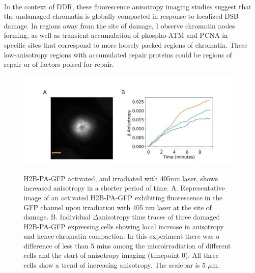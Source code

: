 \paragraph*{} In the context of DDR, these fluorescence anisotropy imaging studies suggest that the undamaged chromatin is globally compacted in response to localized DSB damage. In regions away from the site of damage, I observe chromatin nodes forming, as well as transient accumulation of phospho-ATM and PCNA in specific sites that correspond to more loosely packed regions of chromatin. These low-anisotropy regions with accumulated repair proteins could be regions of repair or of factors poised for repair. 

\begin{figure}[htp]
    {\hfill\includegraphics[clip, width=1\linewidth]{figures/pagfp.png}\hspace*{\fill}}
    \caption{H2B-PA-GFP activated, and irradiated with 405nm laser, shows increased anisotropy in a shorter period of time. A. Representative image of an activated H2B-PA-GFP exhibiting fluorescence in the GFP channel upon irradiation with 405 nm laser at the site of damage. B. Individual $\Delta$anisotropy time traces of three damaged H2B-PA-GFP expressing cells showing local increase in anisotropy and hence chromatin compaction. In this experiment there was a difference of less than 5 mins among the microirradiation of different cells and the start of anisotropy imaging (timepoint 0). All three cells show a trend of increasing anisotropy. The scalebar is 5 $\mu$m.}
    {\label{fig:pagfp}}
\end{figure}


